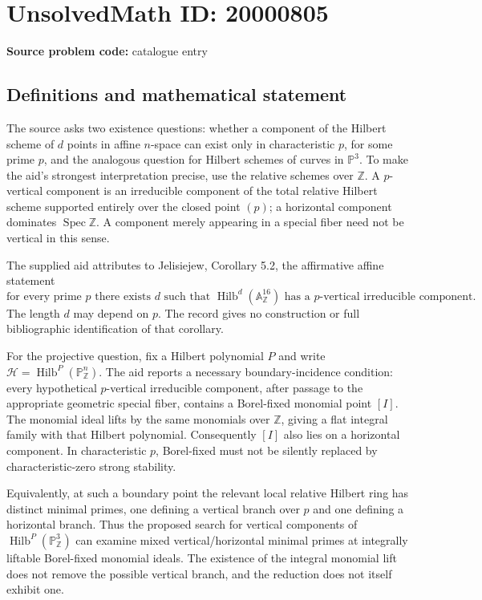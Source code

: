 \documentclass[11pt]{article}
\newcommand{\Z}{\mathbb{Z}}
\newcommand{\A}{\mathbb{A}}
\newcommand{\PP}{\mathbb{P}}
\begin{document}
\section*{UnsolvedMath ID: 20000805}
\textbf{Source problem code:} catalogue entry
\subsection{Definitions and mathematical statement}
The source asks two existence questions: whether a component of the Hilbert scheme of $d$ points in affine $n$-space can exist only in characteristic $p$, for some prime $p$, and the analogous question for Hilbert schemes of curves in $\PP^3$. To make the aid's strongest interpretation precise, use the relative schemes over $\Z$. A $p$-vertical component is an irreducible component of the total relative Hilbert scheme supported entirely over the closed point $(p)$; a horizontal component dominates $\operatorname{Spec}\Z$. A component merely appearing in a special fiber need not be vertical in this sense.

The supplied aid attributes to Jelisiejew, Corollary 5.2, the affirmative affine statement
\[
 \text{for every prime }p\text{ there exists }d\text{ such that }
 \operatorname{Hilb}^{d}(\A^{16}_{\Z})
 \text{ has a }p\text{-vertical irreducible component}.
\]
The length $d$ may depend on $p$. The record gives no construction or full bibliographic identification of that corollary.

For the projective question, fix a Hilbert polynomial $P$ and write $\mathcal H=\operatorname{Hilb}^{P}(\PP^n_{\Z})$. The aid reports a necessary boundary-incidence condition: every hypothetical $p$-vertical irreducible component, after passage to the appropriate geometric special fiber, contains a Borel-fixed monomial point $[I]$. The monomial ideal lifts by the same monomials over $\Z$, giving a flat integral family with that Hilbert polynomial. Consequently $[I]$ also lies on a horizontal component. In characteristic $p$, Borel-fixed must not be silently replaced by characteristic-zero strong stability.

Equivalently, at such a boundary point the relevant local relative Hilbert ring has distinct minimal primes, one defining a vertical branch over $p$ and one defining a horizontal branch. Thus the proposed search for vertical components of $\operatorname{Hilb}^{P}(\PP^3_{\Z})$ can examine mixed vertical/horizontal minimal primes at integrally liftable Borel-fixed monomial ideals. The existence of the integral monomial lift does not remove the possible vertical branch, and the reduction does not itself exhibit one.
\end{document}
